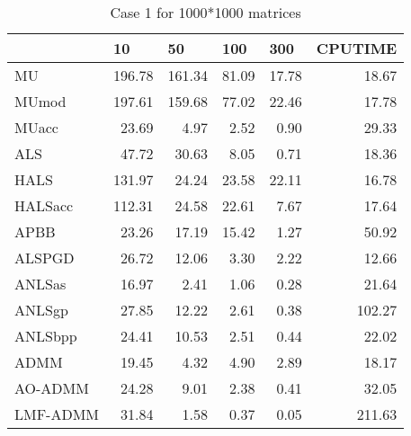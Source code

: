 \documentclass{article}
\begin{document}
\begin{table}[H]
		\caption{Case 1 for 1000*1000 matrices}
	\centering
	\begin{tabular}{|l|r|r|r|r|r|}
		\hline
		& \multicolumn{1}{l|}{10} & \multicolumn{1}{l|}{50} & \multicolumn{1}{l|}{100} & \multicolumn{1}{l|}{300} & \multicolumn{1}{l|}{CPUTIME} \\ \hline
		MU       & 196.78                  & 161.34                  & 81.09                    & 17.78                    & 18.67                        \\ \hline
		MUmod    & 197.61                  & 159.68                  & 77.02                    & 22.46                    & 17.78                        \\ \hline
		MUacc    & 23.69                   & 4.97                    & 2.52                     & 0.90                     & 29.33                        \\ \hline
		ALS      & 47.72                   & 30.63                   & 8.05                     & 0.71                     & 18.36                        \\ \hline
		HALS     & 131.97                  & 24.24                   & 23.58                    & 22.11                    & 16.78                        \\ \hline
		HALSacc  & 112.31                  & 24.58                   & 22.61                    & 7.67                     & 17.64                        \\ \hline
		APBB     & 23.26                   & 17.19                   & 15.42                    & 1.27                     & 50.92                        \\ \hline
		ALSPGD   & 26.72                   & 12.06                   & 3.30                     & 2.22                     & 12.66                        \\ \hline
		ANLSas   & 16.97                   & 2.41                    & 1.06                     & 0.28                     & 21.64                        \\ \hline
		ANLSgp   & 27.85                   & 12.22                   & 2.61                     & 0.38                     & 102.27                       \\ \hline
		ANLSbpp  & 24.41                   & 10.53                   & 2.51                     & 0.44                     & 22.02                        \\ \hline
		ADMM     & 19.45                   & 4.32                    & 4.90                     & 2.89                     & 18.17                        \\ \hline
		AO-ADMM  & 24.28                   & 9.01                    & 2.38                     & 0.41                     & 32.05                        \\ \hline
		LMF-ADMM & 31.84                   & 1.58                    & 0.37                     & 0.05                     & 211.63                       \\ \hline
	\end{tabular}
\end{table}
\end{document}
